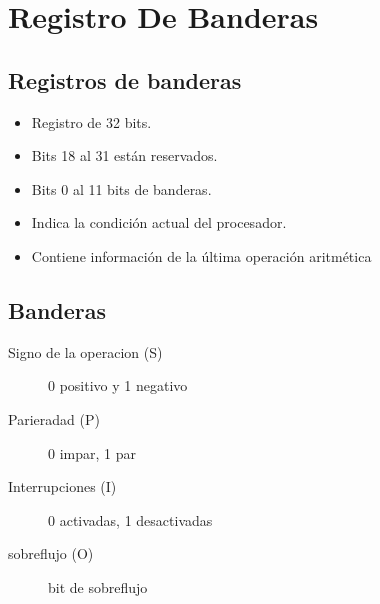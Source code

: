 \documentclass[12pt]{article}
\begin{document}
\section*{Registro De Banderas}
\label{sec:org3199ddc}
\subsection*{Registros de banderas}
\label{sec:org0c3e2d0}
\begin{itemize}
\item Registro de 32 bits.
\item Bits 18 al 31 están reservados.
\item Bits 0 al 11 bits de banderas.
\item Indica la condición actual del procesador.
\item Contiene información de la última operación aritmética
\end{itemize}

\subsection*{Banderas}
\label{sec:org76659a0}
\begin{description}
\item[{Signo de la operacion (S)}] 0 positivo y 1 negativo
\item[{Parieradad (P)}] 0 impar, 1 par
\item[{Interrupciones (I)}] 0 activadas, 1 desactivadas
\item[{sobreflujo (O)}] bit de sobreflujo
\end{description}
\end{document}
